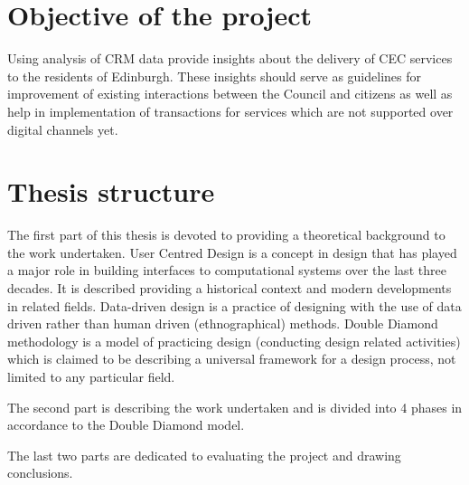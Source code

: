 	\section{Objective of the project}

Using analysis of CRM data provide insights about the delivery of CEC services to the residents of Edinburgh. These insights should serve as guidelines for improvement of existing interactions between the Council and citizens as well as help in implementation of transactions for services which are not supported over digital channels yet.

	\section{Thesis structure}

The first part of this thesis is devoted to providing a theoretical background to the work undertaken. User Centred Design is a concept in design that has played a major role in building interfaces to computational systems over the last three decades. It is described providing a historical context and modern developments in related fields. Data-driven design is a practice of designing with the use of data driven rather than human driven (ethnographical) methods. Double Diamond methodology is a model of practicing design (conducting design related activities) which is claimed to be describing a universal framework for a design process, not limited to any particular field.

The second part is describing the work undertaken and is divided into 4 phases in accordance to the Double Diamond model.

The last two parts are dedicated to evaluating the project and drawing conclusions.